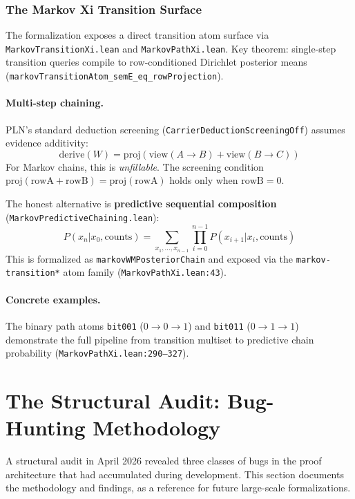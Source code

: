 \documentclass[11pt,a4paper]{article}
\theoremstyle{definition}
\begin{document}
\subsubsection{The Markov Xi Transition Surface}

The formalization exposes a direct transition atom surface via
\texttt{MarkovTransitionXi.lean} and \texttt{MarkovPathXi.lean}.
Key theorem: single-step transition queries compile to row-conditioned
Dirichlet posterior means (\texttt{markovTransitionAtom\_semE\_eq\_rowProjection}).

\paragraph{Multi-step chaining.} PLN's standard deduction screening
(\texttt{CarrierDeductionScreeningOff}) assumes evidence additivity:
\[
  \mathrm{derive}(W) = \mathrm{proj}(\mathrm{view}(A{\to}B) + \mathrm{view}(B{\to}C))
\]
For Markov chains, this is \emph{unfillable}. The screening condition
$\mathrm{proj}(\mathrm{rowA} + \mathrm{rowB}) = \mathrm{proj}(\mathrm{rowA})$
holds only when $\mathrm{rowB} = 0$.

The honest alternative is \textbf{predictive sequential composition}
(\texttt{MarkovPredictiveChaining.lean}):
\[
  P(x_n | x_0, \mathrm{counts}) = \sum_{x_1,\ldots,x_{n-1}} \prod_{i=0}^{n-1} P(x_{i+1} | x_i, \mathrm{counts})
\]
This is formalized as \texttt{markovWMPosteriorChain} and exposed via
the \texttt{markov-transition*} atom family (\texttt{MarkovPathXi.lean:43}).

\paragraph{Concrete examples.} The binary path atoms \texttt{bit001} ($0 \to 0 \to 1$)
and \texttt{bit011} ($0 \to 1 \to 1$) demonstrate the full pipeline from
transition multiset to predictive chain probability (\texttt{MarkovPathXi.lean:290--327}).

\section{The Structural Audit: Bug-Hunting Methodology}
\label{sec:audit}

A structural audit in April 2026 revealed three classes of bugs in the
proof architecture that had accumulated during development. This section
documents the methodology and findings, as a reference for future
large-scale formalizations.
\end{document}

